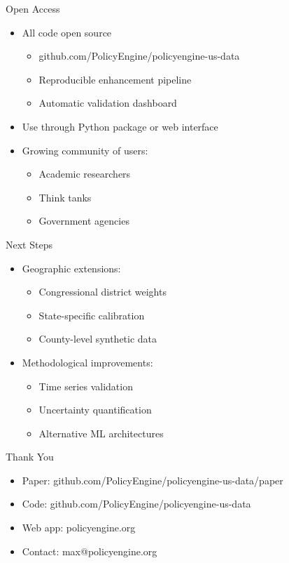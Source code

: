 \documentclass{beamer}
\begin{document}
\begin{frame}{Open Access}
    \begin{itemize}
        \item All code open source
        \begin{itemize}
            \item github.com/PolicyEngine/policyengine-us-data
            \item Reproducible enhancement pipeline
            \item Automatic validation dashboard
        \end{itemize}
        \pause
        \item Use through Python package or web interface
        \pause
        \item Growing community of users:
        \begin{itemize}
            \item Academic researchers
            \item Think tanks
            \item Government agencies
        \end{itemize}
    \end{itemize}
\end{frame}

\begin{frame}{Next Steps}
    \begin{itemize}
        \item Geographic extensions:
        \begin{itemize}
            \item Congressional district weights
            \item State-specific calibration
            \item County-level synthetic data
        \end{itemize}
        \pause
        \item Methodological improvements:
        \begin{itemize}
            \item Time series validation
            \item Uncertainty quantification
            \item Alternative ML architectures
        \end{itemize}
    \end{itemize}
\end{frame}

\begin{frame}{Thank You}
    \begin{itemize}
        \item Paper: github.com/PolicyEngine/policyengine-us-data/paper
        \item Code: github.com/PolicyEngine/policyengine-us-data
        \item Web app: policyengine.org
        \item Contact: max@policyengine.org
    \end{itemize}
\end{frame}
\end{document}
